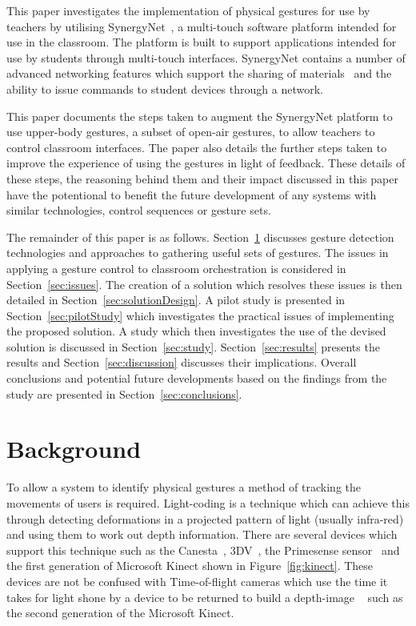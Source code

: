 \documentclass[link]{IWCOMP}
\begin{document}
This paper investigates the implementation of physical gestures for use by teachers by utilising SynergyNet~\cite{HatchA.HigginsSMercier2009}, a multi-touch software platform intended for use in the classroom.
The platform is built to support applications intended for use by students through multi-touch interfaces.
SynergyNet contains a number of advanced networking features which support the sharing of materials~\cite{mcnaughton-et-al:jce2017} and the ability to issue commands to student devices through a network.

This paper documents the steps taken to augment the SynergyNet platform to use upper-body gestures, a subset of open-air gestures, to allow teachers to control classroom interfaces.
The paper also details the further steps taken to improve the experience of using the gestures in light of feedback.
These details of these steps, the reasoning behind them and their impact discussed in this paper have the potentional to benefit the future development of any systems with similar technologies, control sequences or gesture sets.

The remainder of this paper is as follows. 
Section~\ref{sec:background} discusses gesture detection technologies and approaches to gathering useful sets of gestures.
The issues in applying a gesture control to classroom orchestration is considered in Section~\ref{sec:issues}.
The creation of a solution which resolves these issues is then detailed in Section~\ref{sec:solutionDesign}.
A pilot study is presented in Section~\ref{sec:pilotStudy} which investigates the practical issues of implementing the proposed solution.
A study which then investigates the use of the devised solution is discussed in Section~\ref{sec:study}.
Section~\ref{sec:results} presents the results and Section~\ref{sec:discussion} discusses their implications.
Overall conclusions and potential future developments based on the findings from the study are presented in Section~\ref{sec:conclusions}.

\section{Background} 
\label{sec:background}


To allow a system to identify physical gestures a method of tracking the movements of users is required.
Light-coding is a technique which can achieve this through detecting deformations in a projected pattern of light (usually infra-red) and using them to work out depth information.
There are several devices which support this technique such as the Canesta~\cite{Yang2007}, 3DV~\cite{Wilson2007a}, the Primesense sensor~\cite{Wilson2010} and the first generation of Microsoft Kinect shown in Figure~\ref{fig:kinect}.
These devices are not be confused with Time-of-flight cameras which use the time it takes for light shone by a device to be returned to build a depth-image ~\cite{Lange2001} such as the second generation of the Microsoft Kinect.
\end{document}
